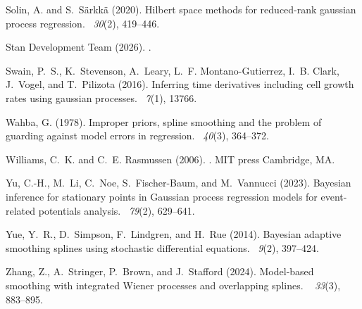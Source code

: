 \documentclass[11pt,a4paper]{article}
\theoremstyle{definition}
\theoremstyle{remark}
\begin{document}
\begin{thebibliography}{}
Solin, A. and S.~S{\"a}rkk{\"a} (2020).
\newblock Hilbert space methods for reduced-rank gaussian process regression.
~{\em 30\/}(2), 419--446.

{Stan Development Team} (2026).
.

Swain, P.~S., K.~Stevenson, A.~Leary, L.~F. Montano-Gutierrez, I.~B. Clark,
  J.~Vogel, and T.~Pilizota (2016).
\newblock Inferring time derivatives including cell growth rates using gaussian
  processes.
~{\em 7\/}(1), 13766.

Wahba, G. (1978).
\newblock Improper priors, spline smoothing and the problem of guarding against
  model errors in regression.
~{\em 40\/}(3), 364--372.

Williams, C.~K. and C.~E. Rasmussen (2006).
.
\newblock MIT press Cambridge, MA.

Yu, C.-H., M.~Li, C.~Noe, S.~Fischer-Baum, and M.~Vannucci (2023).
\newblock Bayesian inference for stationary points in {Gaussian} process
  regression models for event-related potentials analysis.
~{\em 79\/}(2), 629--641.

Yue, Y.~R., D.~Simpson, F.~Lindgren, and H.~Rue (2014).
\newblock Bayesian adaptive smoothing splines using stochastic differential
  equations.
~{\em 9\/}(2), 397--424.

Zhang, Z., A.~Stringer, P.~Brown, and J.~Stafford (2024).
\newblock Model-based smoothing with integrated {Wiener} processes and
  overlapping splines.
~{\em
  33\/}(3), 883--895.

\end{thebibliography}
\end{document}
